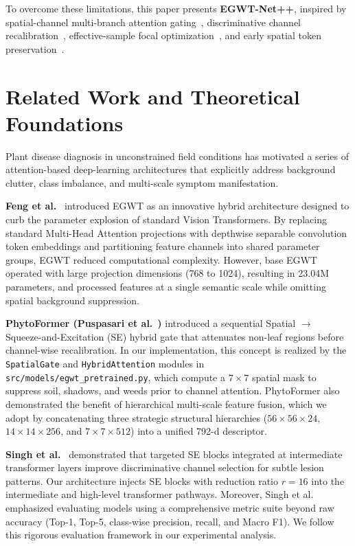 \documentclass[conference]{IEEEtran}
\let\origsection\section
\renewcommand{\section}{\needspace{6\baselineskip}\origsection}
\begin{document}
To overcome these limitations, this paper presents \textbf{EGWT-Net++}, inspired by spatial-channel multi-branch attention gating~\cite{puspasari2026}, discriminative channel recalibration~\cite{singh2026}, effective-sample focal optimization~\cite{shafique2026}, and early spatial token preservation~\cite{nyawose2026}.

\section{Related Work and Theoretical Foundations}
Plant disease diagnosis in unconstrained field conditions has motivated a series of attention-based deep-learning architectures that explicitly address background clutter, class imbalance, and multi-scale symptom manifestation.

\textbf{Feng et al.}~\cite{feng2024} introduced EGWT as an innovative hybrid architecture designed to curb the parameter explosion of standard Vision Transformers. By replacing standard Multi-Head Attention projections with depthwise separable convolution token embeddings and partitioning feature channels into shared parameter groups, EGWT reduced computational complexity. However, base EGWT operated with large projection dimensions (768 to 1024), resulting in 23.04M parameters, and processed features at a single semantic scale while omitting spatial background suppression.

\textbf{PhytoFormer (Puspasari et al.}~\cite{puspasari2026}\textbf{)} introduced a sequential Spatial $\rightarrow$ Squeeze-and-Excitation (SE) hybrid gate that attenuates non-leaf regions before channel-wise recalibration. In our implementation, this concept is realized by the \texttt{SpatialGate} and \texttt{HybridAttention} modules in \texttt{src/models/egwt\_pretrained.py}, which compute a $7 \times 7$ spatial mask to suppress soil, shadows, and weeds prior to channel attention. PhytoFormer also demonstrated the benefit of hierarchical multi-scale feature fusion, which we adopt by concatenating three strategic structural hierarchies ($56 \times 56 \times 24$, $14 \times 14 \times 256$, and $7 \times 7 \times 512$) into a unified 792-d descriptor.

\textbf{Singh et al.}~\cite{singh2026} demonstrated that targeted SE blocks integrated at intermediate transformer layers improve discriminative channel selection for subtle lesion patterns. Our architecture injects SE blocks with reduction ratio $r=16$ into the intermediate and high-level transformer pathways. Moreover, Singh et al. emphasized evaluating models using a comprehensive metric suite beyond raw accuracy (Top-1, Top-5, class-wise precision, recall, and Macro F1). We follow this rigorous evaluation framework in our experimental analysis.
\end{document}
